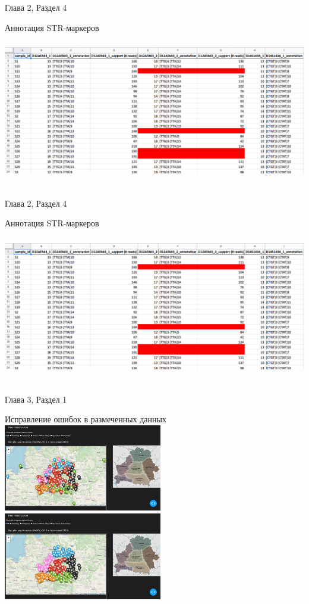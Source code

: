 \documentclass[8pt]{beamer}
\begin{document}
\begin{frame}{Глава 2, Раздел 4}
    \begin{block}{Аннотация STR-маркеров}
        \includegraphics[height=6.8cm]{images/ann.png}
        \centering
    \end{block}
\end{frame}

\begin{frame}{Глава 2, Раздел 4}
    \begin{block}{Аннотация STR-маркеров}
        \includegraphics[height=6.8cm]{images/ann.png}
        \centering
    \end{block}
\end{frame}

\begin{frame}{Глава 3, Раздел 1}
    \begin{block}{Исправление ошибок в размеченных данных}
        \includegraphics[height=3.8cm]{images/geomap_v1.png}
        \includegraphics[height=3.8cm]{images/geomap_v2.png}
        \centering
    \end{block}
\end{frame}
\end{document}
